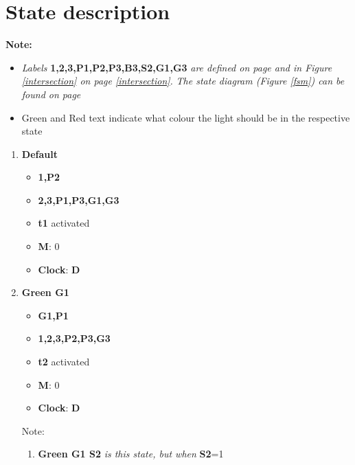 \documentclass[letterpaper]{article}
\begin{document}
\section{State description}
\label{states}
\textbf{Note: }
\begin{itemize}
 \item \textit{Labels}
       \textbf{1,2,3,P1,P2,P3,B3,S2,G1,G3}
       \textit{are defined on page \pageref{Definitions} and in Figure \ref{intersection} on page \ref{intersection}.}
       \textit{The state diagram (Figure \ref{fsm}) can be found on page \pageref{fsm}}
 \item {\color{green}Green} and {\color{red}Red} text indicate what colour the light should be in the respective state
\end{itemize}

\begin{enumerate}
 \item \textbf{Default}
       \begin{itemize}
        \item {\color{green}\textbf{1,P2}}
        \item {\color{red}\textbf{2,3,P1,P3,G1,G3}}
        \item \textbf{t1} activated
        \item \textbf{M}: 0
        \item \textbf{Clock}: \textbf{D}
       \end{itemize}
 \item \textbf{Green G1}
       \begin{itemize}
        \item {\color{green}\textbf{G1,P1}}
        \item {\color{red}\textbf{1,2,3,P2,P3,G3}}
        \item \textbf{t2} activated
        \item \textbf{M}: 0
        \item \textbf{Clock}: \textbf{D}
       \end{itemize}
       Note:
       \begin{enumerate}
        \item \textbf{Green G1 S2} \textit{is this state, but when} \textbf{S2}=1
       \end{enumerate}
       

\end{enumerate}
\end{document}
